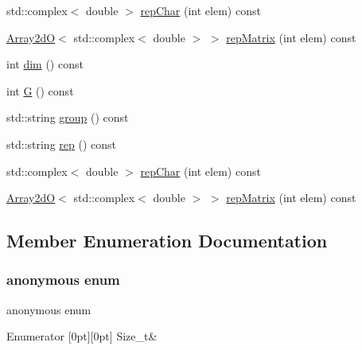 \begin{DoxyCompactItemize}
\item 
std\+::complex$<$ double $>$ \mbox{\hyperlink{structHadron_1_1HuRep_a764617bf3dabef7cd69ffa034e550fff}{rep\+Char}} (int elem) const
\item 
\mbox{\hyperlink{classADAT_1_1Array2dO}{Array2dO}}$<$ std\+::complex$<$ double $>$ $>$ \mbox{\hyperlink{structHadron_1_1HuRep_a744a3604c724067d8912075d0d8acf59}{rep\+Matrix}} (int elem) const
\item 
int \mbox{\hyperlink{structHadron_1_1HuRep_aa222968e65bfc228eb9acf15a7df0388}{dim}} () const
\item 
int \mbox{\hyperlink{structHadron_1_1HuRep_a6486cf33fe424a2226d6fbb2dd7b7d3c}{G}} () const
\item 
std\+::string \mbox{\hyperlink{structHadron_1_1HuRep_ace31fc18f9795a65589ec7014517ac33}{group}} () const
\item 
std\+::string \mbox{\hyperlink{structHadron_1_1HuRep_a4c8b93e1cd7db1a4bacd489f7bb90dbd}{rep}} () const
\item 
std\+::complex$<$ double $>$ \mbox{\hyperlink{structHadron_1_1HuRep_a764617bf3dabef7cd69ffa034e550fff}{rep\+Char}} (int elem) const
\item 
\mbox{\hyperlink{classADAT_1_1Array2dO}{Array2dO}}$<$ std\+::complex$<$ double $>$ $>$ \mbox{\hyperlink{structHadron_1_1HuRep_a744a3604c724067d8912075d0d8acf59}{rep\+Matrix}} (int elem) const
\end{DoxyCompactItemize}


\subsection{Member Enumeration Documentation}
\mbox{\label{structHadron_1_1HuRep_a67c32fec92add2c0c54e0b21251561a4}} 
\subsubsection{\texorpdfstring{anonymous enum}{anonymous enum}}
{\footnotesize\ttfamily anonymous enum}

\begin{DoxyEnumFields}{Enumerator}
[0pt][0pt]{}\mbox{\label{structHadron_1_1HuRep_a67c32fec92add2c0c54e0b21251561a4a11f941d99fca7e86652c1460d6c185ed}} 
Size\+\_\+t&\\
\hline

\end{DoxyEnumFields}
\mbox{\label{structHadron_1_1HuRep_a9ec388d81123fad6325ebf58fb2e2cc3}} 
